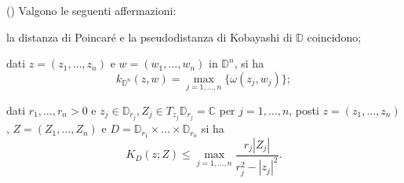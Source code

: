 \begin{prop} \label{k_polidisco}
    (\cite[Section 1 and Section 2]{Roy}) Valgono le seguenti affermazioni:
    \begin{nlist}
        \item la distanza di Poincaré e la pseudodistanza di Kobayashi di $\mathbb{D}$ coincidono;
        \item dati $z=(z_1,\dots,z_n)$ e $w=(w_1,\dots,w_n)$ in $\mathbb{D}^n$, si ha
        $$k_{\mathbb{D}^n}(z,w)=\max_{j=1,\dots,n}\{\omega(z_j,w_j)\};$$
        \item dati $r_1,\dots,r_n>0$ e $z_j\in \mathbb{D}_{r_j}, Z_j\in T_{z_j}\mathbb{D}_{r_j}=\mathbb{C}$ per $j=1,\dots, n$, posti $z=(z_1,\dots,z_n)$, $Z=(Z_1,\dots,Z_n)$ e $D=\mathbb{D}_{r_1}\times\dots\times\mathbb{D}_{r_n}$ si ha
        $$K_D(z;Z) \le \max_{j=1,\dots,n} \frac{r_j|Z_j|}{r_j^2-|z_j|^2}.$$
    \end{nlist}
\end{prop}
